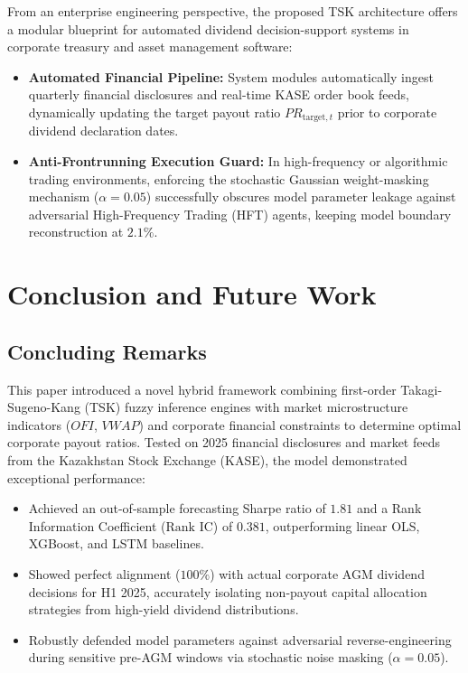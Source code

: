 \documentclass[pdflatex,sn-mathphys-num]{sn-jnl}
\theoremstyle{thmstyleone}
\theoremstyle{thmstyletwo}
\theoremstyle{thmstylethree}
\begin{document}
From an enterprise engineering perspective, the proposed TSK architecture offers a modular blueprint for automated dividend decision-support systems in corporate treasury and asset management software:
\begin{itemize}
    \item \textbf{Automated Financial Pipeline:} System modules automatically ingest quarterly financial disclosures and real-time KASE order book feeds, dynamically updating the target payout ratio $PR_{\text{target},t}$ prior to corporate dividend declaration dates.
    \item \textbf{Anti-Frontrunning Execution Guard:} In high-frequency or algorithmic trading environments, enforcing the stochastic Gaussian weight-masking mechanism ($\alpha = 0.05$) successfully obscures model parameter leakage against adversarial High-Frequency Trading (HFT) agents, keeping model boundary reconstruction at $2.1\%$.
\end{itemize}

\section{Conclusion and Future Work}

\subsection{Concluding Remarks}

This paper introduced a novel hybrid framework combining first-order Takagi-Sugeno-Kang (TSK) fuzzy inference engines with market microstructure indicators ($OFI$, $VWAP$) and corporate financial constraints to determine optimal corporate payout ratios. Tested on 2025 financial disclosures and market feeds from the Kazakhstan Stock Exchange (KASE), the model demonstrated exceptional performance:
\begin{itemize}
    \item Achieved an out-of-sample forecasting Sharpe ratio of $1.81$ and a Rank Information Coefficient ($\text{Rank IC}$) of $0.381$, outperforming linear OLS, XGBoost, and LSTM baselines.
    \item Showed perfect alignment ($100\%$) with actual corporate AGM dividend decisions for H1 2025, accurately isolating non-payout capital allocation strategies from high-yield dividend distributions.
    \item Robustly defended model parameters against adversarial reverse-engineering during sensitive pre-AGM windows via stochastic noise masking ($\alpha = 0.05$).
\end{itemize}
\end{document}
